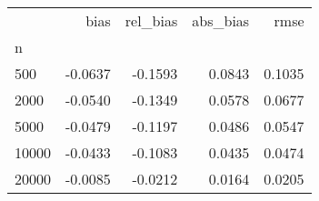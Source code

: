 \begin{tabular}{lrrrr}
\toprule
{} &    bias &  rel\_bias &  abs\_bias &   rmse \\
n     &         &           &           &        \\
\midrule
500   & -0.0637 &   -0.1593 &    0.0843 & 0.1035 \\
2000  & -0.0540 &   -0.1349 &    0.0578 & 0.0677 \\
5000  & -0.0479 &   -0.1197 &    0.0486 & 0.0547 \\
10000 & -0.0433 &   -0.1083 &    0.0435 & 0.0474 \\
20000 & -0.0085 &   -0.0212 &    0.0164 & 0.0205 \\
\bottomrule
\end{tabular}
